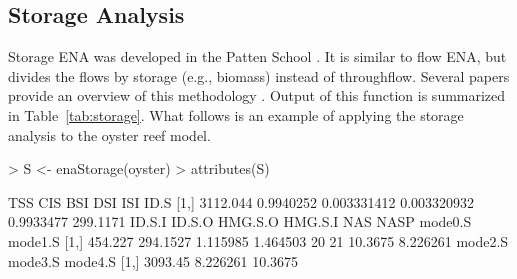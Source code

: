 \documentclass[article]{jss}
\begin{document}
\subsection{Storage Analysis}

Storage ENA was developed in the Patten School
\citep{barber1978retrospective, barber1978markovian}.  It is similar
to flow ENA, but divides the flows by storage (e.g., biomass) instead
of throughflow.  Several papers provide an overview of this
methodology \cite{fath99_review, gattie06, schramski11}.  Output of
this function is summarized in Table~\ref{tab:storage}. What follows
is an example of applying the storage analysis to the oyster reef
model.

\begin{Schunk}
\begin{Sinput}
> S <- enaStorage(oyster)
> attributes(S)
\end{Sinput}
\begin{Soutput}
          TSS       CIS         BSI         DSI       ISI     ID.S
[1,] 3112.044 0.9940252 0.003331412 0.003320932 0.9933477 299.1171
      ID.S.I   ID.S.O  HMG.S.O  HMG.S.I NAS NASP mode0.S  mode1.S
[1,] 454.227 294.1527 1.115985 1.464503  20   21 10.3675 8.226261
     mode2.S  mode3.S mode4.S
[1,] 3093.45 8.226261 10.3675
\end{Soutput}
\end{Schunk}
\end{document}
